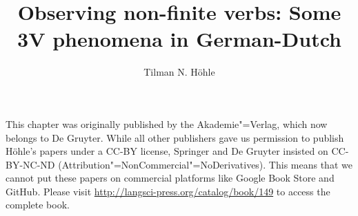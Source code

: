 \documentclass[output=paper]{langsci/langscibook}
\author{Tilman N. Höhle}
\title{Observing non-finite verbs:\newlineCover{} Some {3V} phenomena in {German-Dutch}}
\begin{document}
\label{chap-v3}


\noindent
This chapter was originally published by the Akademie"=Verlag, which now belongs to De Gruyter. While all other publishers gave us permission to publish Höhle's papers under a CC-BY
license, Springer and De Gruyter insisted on CC-BY-NC-ND (Attribution"=NonCommercial"=No\-De\-riv\-a\-tives).
This means that we cannot put these papers on commercial platforms like Google Book Store and GitHub. Please
visit \url{http://langsci-press.org/catalog/book/149} to access the complete book.




\pagebreak~

\setcounter{page}{490}
\label{chap-v3-end}
\end{document}
